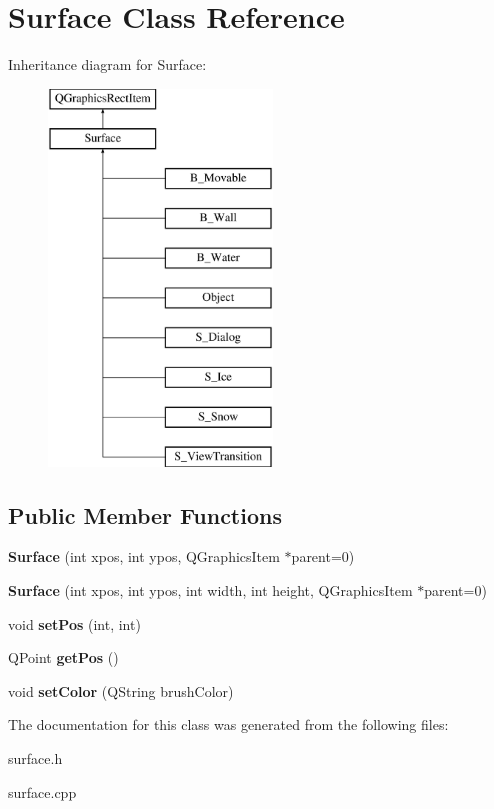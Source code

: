 \hypertarget{class_surface}{}\section{Surface Class Reference}
\label{class_surface}
Inheritance diagram for Surface\+:\begin{figure}[H]
\begin{center}
\leavevmode
\includegraphics[height=10.000000cm]{class_surface}
\end{center}
\end{figure}
\subsection*{Public Member Functions}
\begin{DoxyCompactItemize}
\item 
\hypertarget{class_surface_ac03bea7e4e17982fd17f8a571035a6f0}{}{\bfseries Surface} (int xpos, int ypos, Q\+Graphics\+Item $\ast$parent=0)\label{class_surface_ac03bea7e4e17982fd17f8a571035a6f0}

\item 
\hypertarget{class_surface_a3e1af81e4723f854196608b966a86415}{}{\bfseries Surface} (int xpos, int ypos, int width, int height, Q\+Graphics\+Item $\ast$parent=0)\label{class_surface_a3e1af81e4723f854196608b966a86415}

\item 
\hypertarget{class_surface_a025ed38853ae95be3c6fe8814711ffc3}{}void {\bfseries set\+Pos} (int, int)\label{class_surface_a025ed38853ae95be3c6fe8814711ffc3}

\item 
\hypertarget{class_surface_acbdbf91a4cca74bb9da6c8a2fa932cd7}{}Q\+Point {\bfseries get\+Pos} ()\label{class_surface_acbdbf91a4cca74bb9da6c8a2fa932cd7}

\item 
\hypertarget{class_surface_ab7dd076ec71f2d6a63fe60f6c011786b}{}void {\bfseries set\+Color} (Q\+String brush\+Color)\label{class_surface_ab7dd076ec71f2d6a63fe60f6c011786b}

\end{DoxyCompactItemize}


The documentation for this class was generated from the following files\+:\begin{DoxyCompactItemize}
\item 
surface.\+h\item 
surface.\+cpp\end{DoxyCompactItemize}
